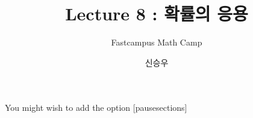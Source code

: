 \documentclass{beamer}
\title{Lecture 8 : 확률의 응용 }
\subtitle{Fastcampus Math Camp}
\author{신승우}
\begin{document}
\begin{frame}
 \titlepage
\end{frame}



  You might wish to add the option [pausesections]










\end{document}
